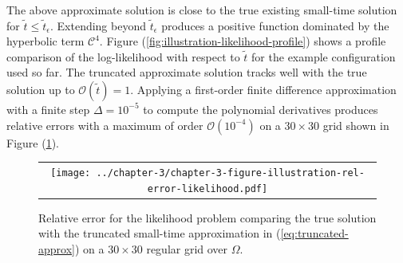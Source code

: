 The above approximate solution is close to the true existing
small-time solution for $\tilde{t} \leq \tilde{t}_\epsilon$. Extending
beyond $\tilde{t}_\epsilon$ produces a positive function dominated by
the hyperbolic term $\mathcal{C}^4$. Figure
(\ref{fig:illustration-likelihood-profile}) shows a profile comparison
of the log-likelihood with respect to $\tilde{t}$ for the example
configuration used so far. The truncated approximate solution tracks
well with the true solution up to $\mathcal{O}(\tilde{t}) =
1$. Applying a first-order finite difference approximation with a
finite step $\Delta = 10^{-5}$ to compute the polynomial derivatives
produces relative errors with a maximum of order
$\mathcal{O}(10^{-4})$ on a $30 \times 30$ grid shown in Figure
(\ref{fig:illustration-rel-error-likelihood}).
\begin{figure}
  \centering
  \begin{tabular}{c}
    \begin{minipage}{0.90\textwidth}
      \centering
      \texttt{[image: ../chapter-3/chapter-3-figure-illustration-rel-error-likelihood.pdf]}
      \caption{Relative error for the likelihood problem comparing the
        true solution with the truncated small-time approximation in
        (\ref{eq:truncated-approx}) on a $30 \times 30$ regular grid
        over $\Omega$. }
      \label{fig:illustration-rel-error-likelihood}
    \end{minipage}
    \end{tabular}
\end{figure}

